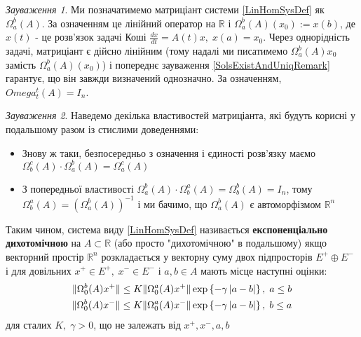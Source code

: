 \documentclass[14pt]{extarticle} %
\theoremstyle{remark}
\newtheorem{remark}{Зауваження}
\begin{document}
\begin{remark}
	Ми позначатимемо матриціант системи \ref{LinHomSysDef} як $\Omega_a^b(A)$. За означенням це лінійний
	оператор на $\mathbb{R}$ і $\Omega_a^b(A)(x_0):=x(b)$, де $x(t)$ - це розв’язок задачі Коші $\frac{dx}{dt}=
	A(t)x,\;x(a)=x_0$. Через однорідність задачі, матриціант є дійсно лінійним (тому надалі ми
	писатимемо $\Omega_a^b(A)x_0$ замість $\Omega_a^b(A)(x_0)$) і попереднє зауваження \ref{SolsExistAndUniqRemark}
	гарантує, що він завжди визначений однозначно. За означенням, $Omega^t_t(A)=I_n$.
\end{remark}
\begin{remark}
Наведемо декілька властивостей матриціанта, які будуть корисні у подальшому разом із стислими доведеннями:
\begin{itemize}
	\item{Знову ж таки, безпосередньо з означення і єдиності розв’язку маємо $\Omega_b^c(A)\cdot\Omega_a^b(A)=\Omega_a^c(A)$}
	\item{З попередньої властивості $\Omega_a^b(A)\cdot\Omega_b^a(A)=\Omega_b^b(A)=I_n$, тому $\Omega_b^a(A)=\left(\Omega_a^b(A)\right)^{-1}$
		і ми бачимо, що $\Omega_a^b(A)$ є автоморфізмом $\mathbb{R}^n$}
\end{itemize}
\end{remark}

Таким чином, система виду \ref{LinHomSysDef} називається \textbf{експоненціально дихотомічною} на $A\subset\mathbb{R}$
(або просто "дихотомічною" в подальшому) якщо векторний простір $\mathbb{R}^n$ розкладається
у векторну суму двох підпросторів $E^+\oplus E^-$ і для довільних $x^+\in E^+,\; x^-\in E^-$ і $a,b\in A$ мають місце наступні оцінки:
\begin{equation}\begin{aligned}\label{DichotomyDef}
	\|\Omega^b_0(A)x^+\|\leq K\|\Omega_0^a(A)x^+\|\exp\left\{-\gamma\left|a-b\right|\right\},\;a\leq b\\
	\|\Omega^b_0(A)x^-\|\leq K\|\Omega_0^a(A)x^-\|\exp\left\{-\gamma\left|a-b\right|\right\},\;b\leq a\\
\end{aligned}\end{equation}
для сталих $K,\;\gamma>0$, що не залежать від $x^+,x^-,a,b$
\end{document}
